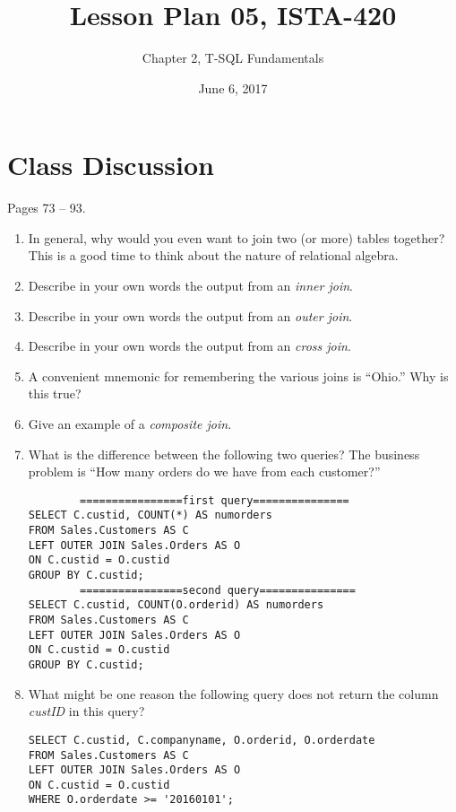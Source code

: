 \documentclass{article}
\title{Lesson Plan 05, ISTA-420}
\author{Chapter 2, T-SQL Fundamentals}
\date{June 6, 2017}
\begin{document}
    

    \maketitle{}

    \section{Class Discussion}

    Pages 73 -- 93.

    \begin{enumerate}
        \item In general, why would you even want to join two (or more) tables together? This is a good time to think about the nature of relational algebra.
        \item Describe in your own words the output from an \textit{inner join}.
        \item Describe in your own words the output from an \textit{outer join}.
        \item Describe in your own words the output from an \textit{cross join}.
        \item A convenient mnemonic for remembering the various joins is ``Ohio.'' Why is this true?
        \item Give an example of a \textit{composite join.}
        \item What is the difference between the following two queries? The business problem is ``How many orders do we have from each customer?''

        \begin{verbatim}
        ================first query===============
SELECT C.custid, COUNT(*) AS numorders
FROM Sales.Customers AS C
LEFT OUTER JOIN Sales.Orders AS O
ON C.custid = O.custid
GROUP BY C.custid;
        ================second query===============
SELECT C.custid, COUNT(O.orderid) AS numorders
FROM Sales.Customers AS C
LEFT OUTER JOIN Sales.Orders AS O
ON C.custid = O.custid
GROUP BY C.custid;
        \end{verbatim}
    \item What might be one reason the following query does not return the column \textit{custID} in this query?

        \begin{verbatim}
SELECT C.custid, C.companyname, O.orderid, O.orderdate
FROM Sales.Customers AS C
LEFT OUTER JOIN Sales.Orders AS O
ON C.custid = O.custid
WHERE O.orderdate >= '20160101';
        \end{verbatim}

    \end{enumerate}
\end{document}
